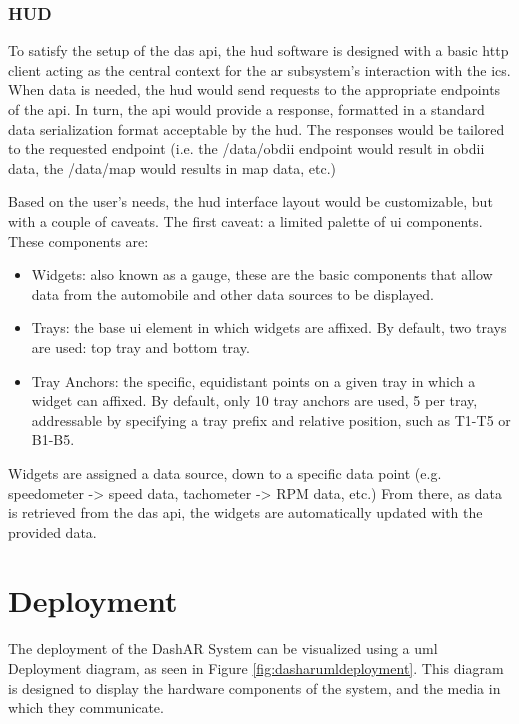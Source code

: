             \subsubsection{HUD}
                \par To satisfy the setup of the \gls{das} \gls{api}, the \gls{hud} software is designed with a basic \gls{http} client acting as the central context for the \gls{ar} subsystem's interaction with the \gls{ics}. When data is needed, the \gls{hud} would send requests to the appropriate endpoints of the \gls{api}. In turn, the \gls{api} would provide a response, formatted in a standard data serialization format acceptable by the \gls{hud}. The responses would be tailored to the requested endpoint (i.e. the /data/obdii endpoint would result in \gls{obdii} data, the /data/map would results in map data, etc.)

                \par Based on the user's needs, the \gls{hud} interface layout would be customizable, but with a couple of caveats. The first caveat: a limited palette of \gls{ui} components. These components are:

                \begin{itemize}
                    \item Widgets: also known as a gauge, these are the basic components that allow data from the automobile and other data sources to be displayed.
                    \item Trays: the base \gls{ui} element in which widgets are affixed. By default, two trays are used: top tray and bottom tray.
                    \item Tray Anchors: the specific, equidistant points on a given tray in which a widget can affixed. By default, only 10 tray anchors are used, 5 per tray, addressable by specifying a tray prefix and relative position, such as T1-T5 or B1-B5.
                \end{itemize}

                \par Widgets are assigned a data source, down to a specific data point (e.g. speedometer -> speed data, tachometer -> RPM data, etc.) From there, as data is retrieved from the \gls{das} \gls{api}, the widgets are automatically updated with the provided data.

\section{Deployment}
    \par The deployment of the DashAR System can be visualized using a \gls{uml} Deployment diagram, as seen in Figure \ref{fig:dasharumldeployment}. This diagram is designed to display the hardware components of the system, and the media in which they communicate.

